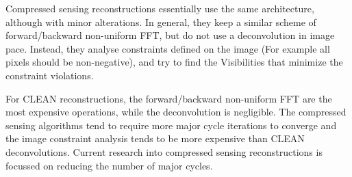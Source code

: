 Compressed sensing reconstructions essentially use the same architecture, although with minor alterations. In general, they keep a similar scheme of forward/backward non-uniform FFT, but do not use a deconvolution in image pace. Instead, they analyse constraints defined on the image (For example all pixels should be non-negative), and try to find the Visibilities that minimize the constraint violations.

For CLEAN reconstructions, the forward/backward non-uniform FFT are the most expensive operations, while the deconvolution is negligible. The compressed sensing algorithms tend to require more major cycle iterations to converge and the image constraint analysis tends to be more expensive than CLEAN deconvolutions. Current research into compressed sensing reconstructions is focussed on reducing the number of major cycles\cite{dabbech2018cygnus}. 









